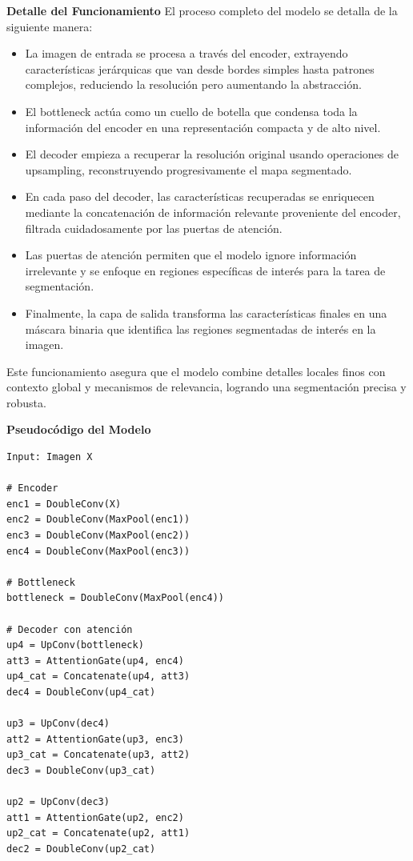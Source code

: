\begin{enumerate}
\begin{itemize}
\textbf{Detalle del Funcionamiento}
El proceso completo del modelo se detalla de la siguiente manera:
\begin{itemize}
\item La imagen de entrada se procesa a través del encoder, extrayendo características jerárquicas que van desde bordes simples hasta patrones complejos, reduciendo la resolución pero aumentando la abstracción.
\item El bottleneck actúa como un cuello de botella que condensa toda la información del encoder en una representación compacta y de alto nivel.
\item El decoder empieza a recuperar la resolución original usando operaciones de upsampling, reconstruyendo progresivamente el mapa segmentado.
\item En cada paso del decoder, las características recuperadas se enriquecen mediante la concatenación de información relevante proveniente del encoder, filtrada cuidadosamente por las puertas de atención.
\item Las puertas de atención permiten que el modelo ignore información irrelevante y se enfoque en regiones específicas de interés para la tarea de segmentación.
\item Finalmente, la capa de salida transforma las características finales en una máscara binaria que identifica las regiones segmentadas de interés en la imagen.
\end{itemize}

Este funcionamiento asegura que el modelo combine detalles locales finos con contexto global y mecanismos de relevancia, logrando una segmentación precisa y robusta.


\textbf{Pseudocódigo del Modelo}
\begin{verbatim}
Input: Imagen X

# Encoder
enc1 = DoubleConv(X)
enc2 = DoubleConv(MaxPool(enc1))
enc3 = DoubleConv(MaxPool(enc2))
enc4 = DoubleConv(MaxPool(enc3))

# Bottleneck
bottleneck = DoubleConv(MaxPool(enc4))

# Decoder con atención
up4 = UpConv(bottleneck)
att3 = AttentionGate(up4, enc4)
up4_cat = Concatenate(up4, att3)
dec4 = DoubleConv(up4_cat)

up3 = UpConv(dec4)
att2 = AttentionGate(up3, enc3)
up3_cat = Concatenate(up3, att2)
dec3 = DoubleConv(up3_cat)

up2 = UpConv(dec3)
att1 = AttentionGate(up2, enc2)
up2_cat = Concatenate(up2, att1)
dec2 = DoubleConv(up2_cat)


\end{verbatim}
\end{itemize}
\end{enumerate}
